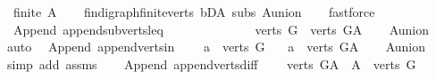 \begin{isabellebody}
\ \ {\isachardoublequoteopen}finite\ A{\isachardoublequoteclose}\isanewline
%
\isadelimproof
\ \ %
\endisadelimproof
%
\isatagproof
{}\isamarkupfalse%
\ fin{\isacharunderscore}{\kern0pt}digraph{\isachardot}{\kern0pt}finite{\isacharunderscore}{\kern0pt}verts\ bD{\isacharunderscore}{\kern0pt}A\ subs{\isacharparenleft}{\kern0pt}{}{\isacharparenright}{\kern0pt}\ A{\isacharunderscore}{\kern0pt}union\isanewline
\ \ \isamarkupfalse%
\ fastforce%
\endisatagproof
{\isafoldproof}%
%
\isadelimproof
\isanewline
%
\endisadelimproof
\ \ \isanewline
\isanewline
{}\isamarkupfalse%
\ {\isacharparenleft}{\kern0pt}\ Append{\isacharparenright}{\kern0pt}\ append{\isacharunderscore}{\kern0pt}subverts{\isacharunderscore}{\kern0pt}leq{\isacharcolon}{\kern0pt}\ \ \ \ \ \ \ \ \ \ \ \ \isanewline
\ \ {\isachardoublequoteopen}verts\ G\ {\isasymsubseteq}\ verts\ G{\isacharunderscore}{\kern0pt}A{\isachardoublequoteclose}\isanewline
%
\isadelimproof
\ \ %
\endisadelimproof
%
\isatagproof
{}\isamarkupfalse%
\ A{\isacharunderscore}{\kern0pt}union\ \isamarkupfalse%
\ auto%
\endisatagproof
{\isafoldproof}%
%
\isadelimproof
\isanewline
%
\endisadelimproof
\isanewline
{}\isamarkupfalse%
\ {\isacharparenleft}{\kern0pt}\ Append{\isacharparenright}{\kern0pt}\ append{\isacharunderscore}{\kern0pt}verts{\isacharunderscore}{\kern0pt}in{\isacharcolon}{\kern0pt}\ \isanewline
\ \ \ {\isachardoublequoteopen}a\ {\isasymin}\ verts\ G{\isachardoublequoteclose}\isanewline
\ \ \ {\isachardoublequoteopen}a\ {\isasymin}\ verts\ G{\isacharunderscore}{\kern0pt}A{\isachardoublequoteclose}\isanewline
%
\isadelimproof
\ \ %
\endisadelimproof
%
\isatagproof
{}\isamarkupfalse%
\ A{\isacharunderscore}{\kern0pt}union\isanewline
\ \ \isamarkupfalse%
\ {\isacharparenleft}{\kern0pt}simp\ add{\isacharcolon}{\kern0pt}\ assms{\isacharparenright}{\kern0pt}%
\endisatagproof
{\isafoldproof}%
%
\isadelimproof
\ \isanewline
%
\endisadelimproof
\isanewline
{}\isamarkupfalse%
\ {\isacharparenleft}{\kern0pt}\ Append{\isacharparenright}{\kern0pt}\ append{\isacharunderscore}{\kern0pt}verts{\isacharunderscore}{\kern0pt}diff{\isacharcolon}{\kern0pt}\ \isanewline
\ \ \ {\isachardoublequoteopen}verts\ G{\isacharunderscore}{\kern0pt}A\ {\isacharminus}{\kern0pt}\ A\ {\isacharequal}{\kern0pt}\ verts\ G{\isachardoublequoteclose}\isanewline
%
\isadelimproof
\ \ %
\endisadelimproof
%
\isatagproof

\end{isabellebody}
